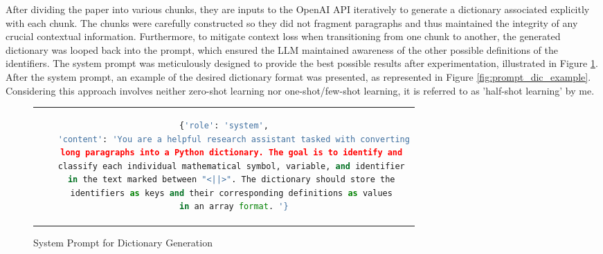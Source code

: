 After dividing the paper into various chunks, they are inputs to the OpenAI API iteratively to generate a dictionary associated explicitly with each chunk. The chunks were carefully constructed so they did not fragment paragraphs and thus maintained the integrity of any crucial contextual information. Furthermore, to mitigate context loss when transitioning from one chunk to another, the generated dictionary was looped back into the prompt, which ensured the LLM maintained awareness of the other possible definitions of the identifiers. The system prompt was meticulously designed to provide the best possible results after experimentation, illustrated in Figure \ref{fig:prompt_dic_system}. After the system prompt, an example of the desired dictionary format was presented, as represented in Figure \ref{fig:prompt_dic_example}. Considering this approach involves neither zero-shot learning nor one-shot/few-shot learning, it is referred to as 'half-shot learning' by me. 

\begin{figure}[htpb]
  \centering
  \begin{tabular}{c}
  \begin{lstlisting}[language=python]
    {'role': 'system',
    'content': 'You are a helpful research assistant tasked with converting
    long paragraphs into a Python dictionary. The goal is to identify and 
    classify each individual mathematical symbol, variable, and identifier 
    in the text marked between "<||>". The dictionary should store the 
    identifiers as keys and their corresponding definitions as values 
    in an array format. '}
  \end{lstlisting}
  \end{tabular}
  \caption[System Prompt for Dictionary Generation]{System Prompt for Dictionary Generation}\label{fig:prompt_dic_system}
\end{figure}


